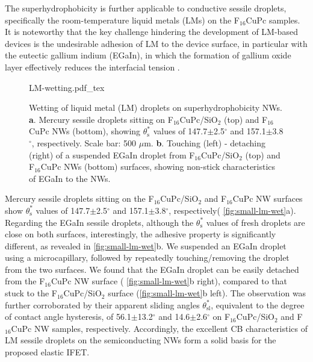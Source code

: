 The superhydrophobicity is further applicable to conductive sessile droplets,
specifically the room-temperature liquid metals\cite{Dickey_2008_EGAIN} (LMs) on the
F\(_{\text{16}}\)CuPc samples.
%
It is noteworthy that the key challenge hindering
the development of LM-based devices is the undesirable adhesion of LM
to the device surface, in particular with the eutectic gallium indium
(EGaIn), in which the formation of gallium oxide layer effectively
reduces the interfacial tension
\cite{Dickey_2008_EGAIN,Doudrick_2014_oxide}.
%
\begin{figure}[htbp]
  \centering
  {LM-wetting.pdf_tex}
  \caption{\label{fig:small-lm-wet}  Wetting of liquid
    metal (LM) droplets on superhydrophobicity NWs.
    \textbf{a}. Mercury sessile droplets sitting on
    F\(_{\text{16}}\)CuPc/SiO\(_{\text{2}}\) (top) and
    F\(_{\text{16}}\)CuPc NWs (bottom), showing
    \(\theta_{\mathrm{s}}^{*}\) values of 147.7\(\pm\)2.5\(^{\circ}\)
    and 157.1\(\pm\)3.8\(^{\circ}\), respectively. Scale bar: 500
    \(\mu\)m. \textbf{b}. Touching (left) - detaching (right) of a
    suspended EGaIn droplet from
    F\(_{\text{16}}\)CuPc/SiO\(_{\text{2}}\) (top) and
    F\(_{\text{16}}\)CuPc NWs (bottom) surfaces, showing non-stick
    characteristics of EGaIn to the NWs.}
\end{figure}
Mercury sessile droplets sitting on the
F\(_{\text{16}}\)CuPc/SiO\(_{\text{2}}\) and F\(_{\text{16}}\)CuPc NW
surfaces show \(\theta_{\mathrm{s}}^{*}\) values of
147.7\(\pm\)2.5\(^{\circ}\) and 157.1\(\pm\)3.8\(^{\circ}\),
respectively( \autoref{fig:small-lm-wet}a).  Regarding the EGaIn
sessile droplets, although the \(\theta_{\mathrm{s}}^{*}\) values of
fresh droplets are close on both surfaces, interestingly, the adhesive
property is significantly different, as revealed in
\autoref{fig:small-lm-wet}b. We suspended an EGaIn droplet using a
microcapillary, followed by repeatedly touching/removing the droplet
from the two surfaces. We found that the EGaIn droplet can be easily
detached from the F\(_{\text{16}}\)CuPc NW surface (
\autoref{fig:small-lm-wet}b right), compared to that stuck to the
F\(_{\text{16}}\)CuPc/SiO\(_{\text{2}}\) surface
(\autoref{fig:small-lm-wet}b left). The observation was further
corroborated by their apparent sliding angles
\(\theta_{\mathrm{sl}}^{*}\), equivalent to the degree of contact
angle hysteresis, of 56.1\(\pm\)13.2\(^{\circ}\) and
14.6\(\pm\)2.6\(^{\circ}\) on F\(_{\text{16}}\)CuPc/SiO\(_{\text{2}}\)
and F\(_{\text{16}}\)CuPc NW samples, respectively. Accordingly, the
excellent CB characteristics of LM sessile droplets on the
semiconducting NWs form a solid basis for the proposed elastic IFET.


